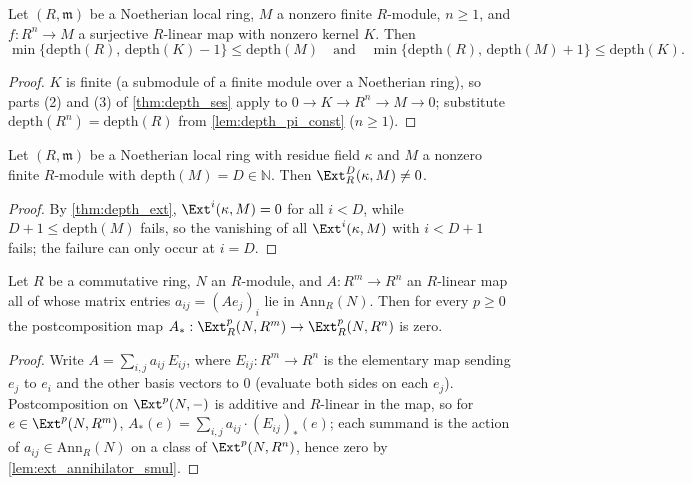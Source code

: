 \begin{lemma}
  \label{lem:depth_ses_kernel}
  \leanok
  Let \((R, \mathfrak m)\) be a Noetherian local ring, \(M\) a nonzero finite
  \(R\)-module, \(n \geq 1\), and \(f : R^n \to M\) a surjective \(R\)-linear map with
  nonzero kernel \(K\). Then
  \[
    \min\{\mathrm{depth}(R),\, \mathrm{depth}(K) - 1\} \leq \mathrm{depth}(M)
    \quad\text{and}\quad
    \min\{\mathrm{depth}(R),\, \mathrm{depth}(M) + 1\} \leq \mathrm{depth}(K).
  \]
\end{lemma}
\begin{proof}
  \leanok
  \(K\) is finite (a submodule of a finite module over a Noetherian ring), so parts (2)
  and (3) of \ref{thm:depth_ses} apply to \(0 \to K \to R^n \to M \to 0\); substitute
  \(\mathrm{depth}(R^n) = \mathrm{depth}(R)\) from \ref{lem:depth_pi_const}
  (\(n \geq 1\)).
\end{proof}

\begin{lemma}
  \label{lem:ext_nonzero_at_depth}
  \leanok
  Let \((R, \mathfrak m)\) be a Noetherian local ring with residue field \(\kappa\) and
  \(M\) a nonzero finite \(R\)-module with \(\mathrm{depth}(M) = D \in \mathbb{N}\).
  Then \(\Ext^D_R(\kappa, M) \neq 0\).
\end{lemma}
\begin{proof}
  \leanok
  By \ref{thm:depth_ext}, \(\Ext^i(\kappa, M) = 0\) for all \(i < D\), while
  \(D + 1 \leq \mathrm{depth}(M)\) fails, so the vanishing of all \(\Ext^i(\kappa, M)\)
  with \(i < D + 1\) fails; the failure can only occur at \(i = D\).
\end{proof}

\begin{lemma}
  \label{lem:ext_matrix_collapse}
  \leanok
  Let \(R\) be a commutative ring, \(N\) an \(R\)-module, and
  \(A : R^m \to R^n\) an \(R\)-linear map all of whose matrix entries
  \(a_{ij} = (A e_j)_i\) lie in \(\mathrm{Ann}_R(N)\). Then for every \(p \geq 0\) the
  postcomposition map \(A_* : \Ext^p_R(N, R^m) \to \Ext^p_R(N, R^n)\) is zero.
\end{lemma}
\begin{proof}
  \leanok
  Write \(A = \sum_{i,j} a_{ij}\, E_{ij}\), where \(E_{ij} : R^m \to R^n\) is the
  elementary map sending \(e_j\) to \(e_i\) and the other basis vectors to \(0\)
  (evaluate both sides on each \(e_j\)). Postcomposition on \(\Ext^p(N, -)\) is additive
  and \(R\)-linear in the map, so for \(e \in \Ext^p(N, R^m)\),
  \(A_*(e) = \sum_{i,j} a_{ij} \cdot (E_{ij})_*(e)\); each summand is the action of
  \(a_{ij} \in \mathrm{Ann}_R(N)\) on a class of \(\Ext^p(N, R^n)\), hence zero by
  \ref{lem:ext_annihilator_smul}.
\end{proof}

